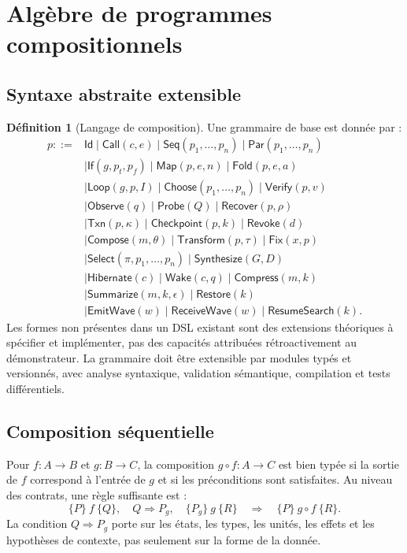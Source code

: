 \documentclass[11pt,a4paper]{article}
\theoremstyle{definition}
\newtheorem{definition}{Définition}[section]
\theoremstyle{plain}
\theoremstyle{remark}
\begin{document}
\section{Algèbre de programmes compositionnels}
\subsection{Syntaxe abstraite extensible}
\begin{definition}[Langage de composition]
Une grammaire de base est donnée par :
\begin{align*}
p ::= {} & \mathsf{Id} \mid \mathsf{Call}(c,e) \mid \mathsf{Seq}(p_1,\dots,p_n) \mid \mathsf{Par}(p_1,\dots,p_n) \\
&\mid \mathsf{If}(g,p_t,p_f) \mid \mathsf{Map}(p,e,n) \mid \mathsf{Fold}(p,e,a) \\
&\mid \mathsf{Loop}(g,p,I) \mid \mathsf{Choose}(p_1,\dots,p_n) \mid \mathsf{Verify}(p,v) \\
&\mid \mathsf{Observe}(q) \mid \mathsf{Probe}(Q) \mid \mathsf{Recover}(p,\rho) \\
&\mid \mathsf{Txn}(p,\kappa) \mid \mathsf{Checkpoint}(p,k) \mid \mathsf{Revoke}(d) \\
&\mid \mathsf{Compose}(m,\theta) \mid \mathsf{Transform}(p,\tau) \mid \mathsf{Fix}(x,p)\\
&\mid \mathsf{Select}(\pi,p_1,\dots,p_n) \mid \mathsf{Synthesize}(G,D) \\
&\mid \mathsf{Hibernate}(c) \mid \mathsf{Wake}(c,q) \mid \mathsf{Compress}(m,k) \\
&\mid \mathsf{Summarize}(m,k,\epsilon) \mid \mathsf{Restore}(k) \\
&\mid \mathsf{EmitWave}(w) \mid \mathsf{ReceiveWave}(w) \mid \mathsf{ResumeSearch}(k).
\end{align*}
Les formes non présentes dans un DSL existant sont des extensions théoriques à spécifier et implémenter, pas des capacités attribuées rétroactivement au démonstrateur. La grammaire doit être extensible par modules typés et versionnés, avec analyse syntaxique, validation sémantique, compilation et tests différentiels.
\end{definition}

\subsection{Composition séquentielle}
Pour $f:A\to B$ et $g:B\to C$, la composition $g\circ f:A\to C$ est bien typée si la sortie de $f$ correspond à l'entrée de $g$ et si les préconditions sont satisfaites. Au niveau des contrats, une règle suffisante est :
\[
\{P\}\ f\ \{Q\},\quad Q\Rightarrow P_g,\quad \{P_g\}\ g\ \{R\}
\quad\Longrightarrow\quad \{P\}\ g\circ f\ \{R\}.
\]
La condition $Q\Rightarrow P_g$ porte sur les états, les types, les unités, les effets et les hypothèses de contexte, pas seulement sur la forme de la donnée.
\end{document}
